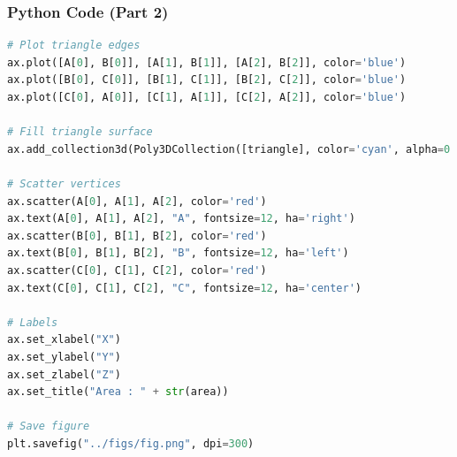 \documentclass{beamer}
\begin{document}
\begin{frame}[fragile]
\frametitle{Python Code (Part 2)}
\begin{lstlisting}[language=Python]
# Plot triangle edges
ax.plot([A[0], B[0]], [A[1], B[1]], [A[2], B[2]], color='blue')
ax.plot([B[0], C[0]], [B[1], C[1]], [B[2], C[2]], color='blue')
ax.plot([C[0], A[0]], [C[1], A[1]], [C[2], A[2]], color='blue')

# Fill triangle surface
ax.add_collection3d(Poly3DCollection([triangle], color='cyan', alpha=0.5))

# Scatter vertices
ax.scatter(A[0], A[1], A[2], color='red')
ax.text(A[0], A[1], A[2], "A", fontsize=12, ha='right')
ax.scatter(B[0], B[1], B[2], color='red')
ax.text(B[0], B[1], B[2], "B", fontsize=12, ha='left')
ax.scatter(C[0], C[1], C[2], color='red')
ax.text(C[0], C[1], C[2], "C", fontsize=12, ha='center')

# Labels
ax.set_xlabel("X")
ax.set_ylabel("Y")
ax.set_zlabel("Z")
ax.set_title("Area : " + str(area))

# Save figure
plt.savefig("../figs/fig.png", dpi=300)

\end{lstlisting}
\end{frame}
\end{document}
